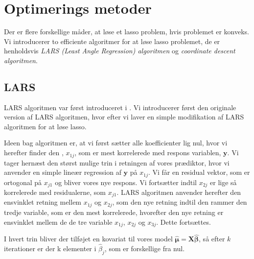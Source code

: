 \chapter{Optimerings metoder} \label{kap:optimeringsmetoder}

Der er flere forskellige måder, at løse et lasso problem, hvis problemet er konveks. 
Vi introducerer to efficiente algoritmer for at løse lasso problemet, de er henholdsvis \textit{ LARS  (Least Angle Regression) algoritmen} og \textit{coordinate descent algoritmen}.

\section{LARS}
LARS algoritmen var først introduceret i \citep{efron}.  
Vi introducerer først den originale version af LARS algoritmen, hvor efter vi laver en simple modifikation af LARS algoritmen for at løse lasso. 

Ideen bag algoritmen er, at vi først sætter alle koefficienter lig nul, hvor vi herefter finder den , $x_{1j}$, som er mest korrelerede med respons variablen, $\textbf{y}$.  
Vi tager hernæst den størst mulige trin i retningen af vores prædiktor, hvor vi anvender en simple lineær regression af $\textbf{y}$ på $x_{1j}$. 
Vi får en residual vektor, som er ortogonal på $x_{j1}$ og bliver vores nye respons. 
Vi fortsætter indtil $x_{2j}$ er lige så korrelerede  med residualerne, som $x_{j1}$. 
LARS algoritmen anvender herefter den ensvinklet retning mellem $x_{1j}$ og $x_{2j}$, som den nye retning indtil den rammer den tredje variable, som er den mest korrelerede, hvorefter den nye retning er ensvinklet mellem de de tre variable $x_{1j}$, $x_{2j}$ og $x_{3j}$. Dette fortsættes. 

I hvert trin bliver der tilføjet en kovariat til vores model $\widehat{\boldsymbol{\mu}} = \textbf{X} \widehat{\boldsymbol{ \beta}}$, så efter $k$ iterationer er der k elementer i  $\widehat{\beta}_j$, som er forskellige fra nul.  

